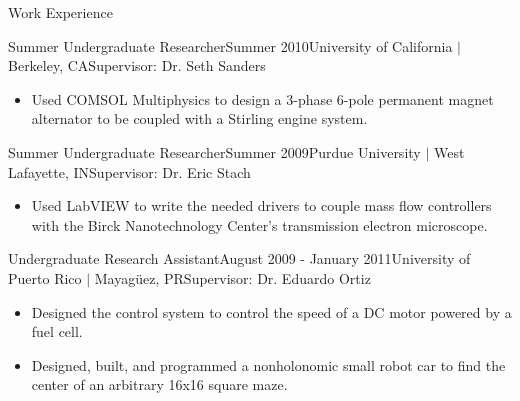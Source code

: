 \documentclass{resume} %
\begin{document}
\begin{rSection}{Work Experience}

\begin{rSubsection}{Summer Undergraduate Researcher}{Summer 2010}{University of California $\vert$ Berkeley, CA}{Supervisor: Dr. Seth Sanders}

\item
\begin{itemize}
\item Used COMSOL Multiphysics to design a 3-phase 6-pole permanent magnet
  alternator to be coupled with a Stirling engine system.
\end{itemize}

\end{rSubsection}


\begin{rSubsection}{Summer Undergraduate Researcher}{Summer 2009}{Purdue University $\vert$ West Lafayette, IN}{Supervisor: Dr. Eric Stach}

\item
\begin{itemize}
\item Used LabVIEW to write the needed drivers to couple mass flow controllers
  with the Birck Nanotechnology Center's transmission electron microscope.
\end{itemize}

\end{rSubsection}


\begin{rSubsection}{Undergraduate Research Assistant}{August 2009 - January 2011}{University of Puerto Rico $\vert$ Mayag\"{u}ez, PR}{Supervisor: Dr. Eduardo Ortiz}

\item
\begin{itemize}
\item Designed the control system to control the speed of a DC motor powered by
  a fuel cell.
\item Designed, built, and programmed a nonholonomic small robot car to find the
  center of an arbitrary 16x16 square maze.
\end{itemize}

\end{rSubsection}



\end{rSection}
\end{document}
